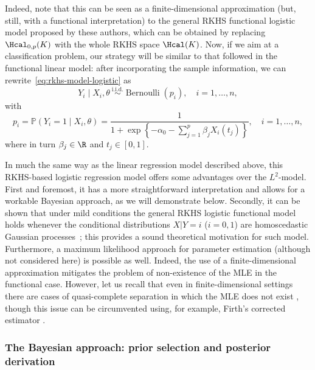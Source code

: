 Indeed, note that this can be seen as a finite-dimensional approximation (but, still, with a functional interpretation) to the general RKHS functional logistic model proposed by these authors, which can be obtained by replacing \(\Hcal_{0,p}(K)\) with the whole RKHS space \(\Hcal(K)\). Now, if we aim at a classification problem, our strategy will be similar to that followed in the functional linear model: after incorporating the sample information, we can rewrite~\eqref{eq:rkhs-model-logistic} as
\begin{equation}\label{eq:rkhs-model-logistic-2}
Y_i \mid X_i,\theta \ \stackrel{\text{i.i.d.}}{\sim} \operatorname{Bernoulli}(p_i), \quad i=1,\dots, n,
\end{equation}
with
\begin{equation}\label{eq:rkhs-model-logistic-2-parameter}
  p_i = \mathbb P(Y_i=1 \mid X_i,\theta) = \frac{1}{\displaystyle 1 + \exp\left\{-\alpha_0 - \sum_{j=1}^p \beta_j X_i(t_j)\right\}}, \quad i=1,\dots, n,
\end{equation}
where in turn \(\beta_j\in\R\) and \(t_j\in[0, 1]\).

In much the same way as the linear regression model described above, this RKHS-based logistic regression model offers some advantages over the \(L^2\)-model. First and foremost, it has a more straightforward interpretation and allows for a workable Bayesian approach, as we will demonstrate below. Secondly, it can be shown that under mild conditions the general RKHS logistic functional model holds whenever the conditional distributions \(X | Y=i\) (\(i=0,1\)) are homoscedastic Gaussian processes~\citep[see Theorem 1 in][]{berrendero2018functional}; this provides a sound theoretical motivation for such model. Furthermore, a maximum likelihood approach for parameter estimation (although not considered here) is possible as well. Indeed, the use of a finite-dimensional approximation  mitigates the problem of non-existence of the MLE in the functional case. However, let us recall that even in finite-dimensional settings there are cases of quasi-complete separation in which the MLE does not exist \citep{albert1984existence}, though this issue can be circumvented using, for example, Firth's corrected estimator \citep{firth1993bias}.
\color{black}

\subsubsection{The Bayesian approach: prior selection and posterior derivation}

